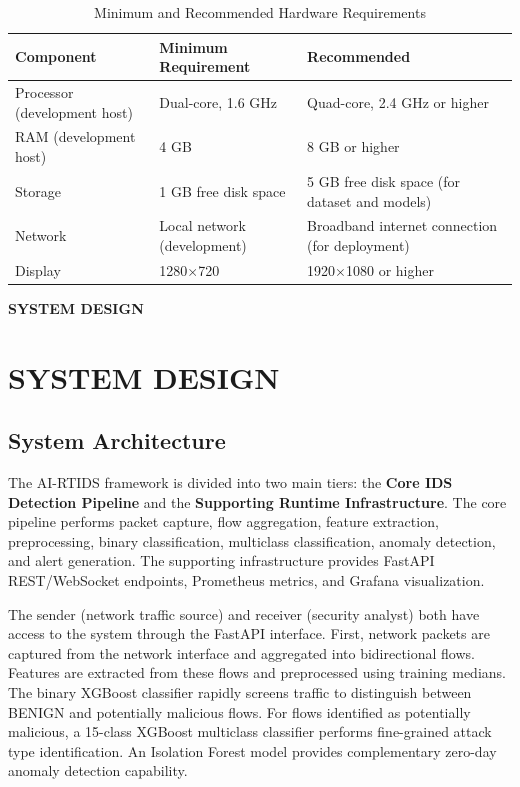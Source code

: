 \documentclass[12pt,a4paper]{report}
\newcommand{\chapterdivider}[1]{%
    \clearpage
    \thispagestyle{empty}
    \vspace*{\fill}
    \begin{center}
        \Huge\bfseries\color{mydarkblue} #1
    \end{center}
    \vspace*{\fill}
    \clearpage
}
\begin{document}
\begin{table}[htbp]
\centering
\caption{Minimum and Recommended Hardware Requirements}
\label{tab:hardware_requirements}
\renewcommand{\arraystretch}{1.35}
\setlength{\tabcolsep}{5pt}

\begin{tabularx}{\textwidth}{|p{3.2cm}|p{4.3cm}|X|}
\hline
\textbf{Component} & \textbf{Minimum Requirement} & \textbf{Recommended} \\
\hline
Processor (development host) & Dual-core, 1.6 GHz & Quad-core, 2.4 GHz or higher \\
\hline
RAM (development host) & 4 GB & 8 GB or higher \\
\hline
Storage & 1 GB free disk space & 5 GB free disk space (for dataset and models) \\
\hline
Network & Local network (development) & Broadband internet connection (for deployment) \\
\hline
Display & 1280$\times$720 & 1920$\times$1080 or higher \\
\hline
\end{tabularx}
\end{table}

\chapterdivider{SYSTEM DESIGN}

\chapter{SYSTEM DESIGN}

\section{System Architecture}

The AI-RTIDS framework is divided into two main tiers: the \textbf{Core IDS Detection Pipeline} and the \textbf{Supporting Runtime Infrastructure}. The core pipeline performs packet capture, flow aggregation, feature extraction, preprocessing, binary classification, multiclass classification, anomaly detection, and alert generation. The supporting infrastructure provides FastAPI REST/WebSocket endpoints, Prometheus metrics, and Grafana visualization.

The sender (network traffic source) and receiver (security analyst) both have access to the system through the FastAPI interface. First, network packets are captured from the network interface and aggregated into bidirectional flows. Features are extracted from these flows and preprocessed using training medians. The binary XGBoost classifier rapidly screens traffic to distinguish between BENIGN and potentially malicious flows. For flows identified as potentially malicious, a 15-class XGBoost multiclass classifier performs fine-grained attack type identification. An Isolation Forest model provides complementary zero-day anomaly detection capability.
\end{document}
